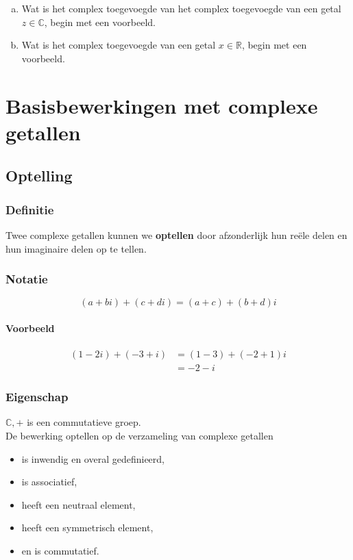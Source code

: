 \documentclass[12pt,twoside,a4paper]{article}
\begin{document}
\begin{oefening}
\begin{enumerate}[(a)]
  \item Wat is het complex toegevoegde van het complex toegevoegde van een getal $z\in\mathbb{C}$, begin met een voorbeeld.
  \item Wat is het complex toegevoegde van een getal $x\in\mathbb{R}$, begin met een voorbeeld.
\end{enumerate}
\end{oefening}

\cleardoublepage
\section{Basisbewerkingen met complexe getallen}

\subsection{Optelling}

\subsubsection*{Definitie}
\begin{mdframed}
Twee complexe getallen kunnen we {\bf optellen} door afzonderlijk hun reële delen en hun imaginaire delen op te tellen.
\end{mdframed}

\subsubsection*{Notatie}
$$(a+bi) + (c+di) = (a+c) + (b+d)i$$

\paragraph{Voorbeeld}
\begin{align*}
  (1 - 2i) + (-3 + i) &= (1 - 3) + (-2 + 1)i \\
                      &= -2-i
\end{align*}

\subsubsection*{Eigenschap}
$\mathbb{C},+$ is een commutatieve groep.\\
De bewerking optellen op de verzameling van complexe getallen
\begin{itemize}
  \item is inwendig en overal gedefinieerd,
  \item is associatief,
  \item heeft een neutraal element,
  \item heeft een symmetrisch element,
  \item en is commutatief.
\end{itemize}
\end{document}
